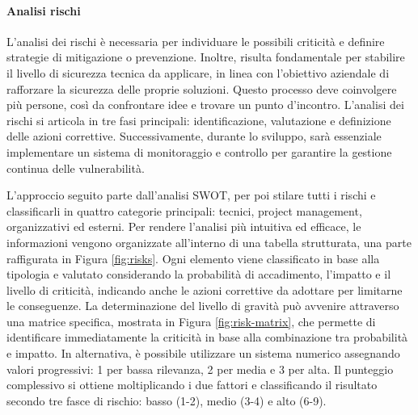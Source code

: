             \paragraph{Analisi rischi}
            L’analisi dei rischi è necessaria per individuare le possibili criticità e definire strategie di mitigazione o prevenzione.
            Inoltre, risulta fondamentale per stabilire il livello di sicurezza tecnica da applicare, in linea con l’obiettivo
            aziendale di rafforzare la sicurezza delle proprie soluzioni. Questo processo deve coinvolgere più persone, così da
            confrontare idee e trovare un punto d’incontro.
            L’analisi dei rischi si articola in tre fasi principali: identificazione, valutazione e definizione delle azioni correttive.
            Successivamente, durante lo sviluppo, sarà essenziale implementare un sistema di monitoraggio e controllo per garantire
            la gestione continua delle vulnerabilità.

            L’approccio seguito parte dall'analisi SWOT, per poi stilare tutti i rischi e classificarli
            in quattro categorie principali: tecnici, project management, organizzativi ed esterni.
            Per rendere l’analisi più intuitiva ed efficace, le informazioni vengono organizzate all’interno di una tabella strutturata,
            una parte raffigurata in Figura \ref{fig:risks}.
            Ogni elemento viene classificato in base alla tipologia e valutato considerando la probabilità di accadimento, l’impatto
            e il livello di criticità, indicando anche le azioni correttive da adottare per limitarne le conseguenze.
            La determinazione del livello di gravità può avvenire attraverso una matrice specifica, mostrata in Figura \ref{fig:risk-matrix},
            che permette di identificare
            immediatamente la criticità in base alla combinazione tra probabilità e impatto. In alternativa, è possibile utilizzare
            un sistema numerico assegnando valori progressivi: 1 per bassa rilevanza, 2 per media e 3 per alta. Il punteggio
            complessivo si ottiene moltiplicando i due fattori e classificando il risultato secondo tre fasce di rischio:
            basso (1-2), medio (3-4) e alto (6-9).

